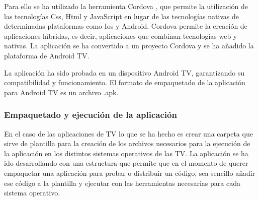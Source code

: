 Para ello se ha utilizado la herramienta Cordova \cite{Cordova}, que permite la utilización de las tecnologías
Css, Html y JavaScript en lugar de las tecnologías nativas de determinadas plataformas como Ios y Android.
Cordova permite la creación de aplicaciones híbridas, es decir, aplicaciones que combinan tecnologías web y
nativas. La aplicación se ha convertido a un proyecto Cordova y se ha añadido la plataforma de Android TV.

La aplicación ha sido probada en un dispositivo Android TV, garantizando su compatibilidad y funcionamiento.
El formato de empaquetado de la aplicación para Android TV es un archivo .apk.


\subsubsection{Empaquetado y ejecución de la aplicación}
\label{subsubsec:adaptabilidad_empaquetado_ejecucion}

En el caso de las aplicaciones de TV lo que se ha hecho es crear una carpeta que sirve de plantilla para
la creación de los archivos necesarios para la ejecución de la aplicación en los distintos sistemas operativos
de las TV. La aplicación se ha ido desarrollando con una estructura que permite que en el momento de querer empaquetar
una aplicación para probar o distribuir un código, sea sencillo añadir ese código a la plantilla y ejecutar con 
las herramientas necesarias para cada sistema operativo.


